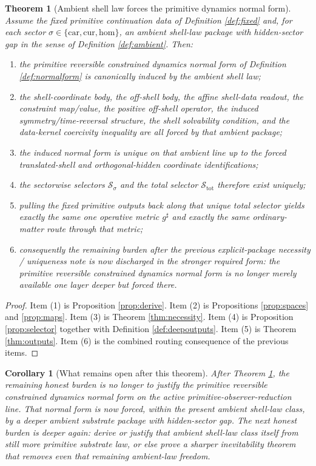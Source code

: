 \documentclass[11pt]{article}
\newcommand{\CompletedMetric}{g^{\sharp}}
\newcommand{\Car}{\mathrm{car}}
\newcommand{\Cur}{\mathrm{cur}}
\newcommand{\Hom}{\mathrm{hom}}
\newcommand{\ChainSelect}[1]{\mathcal S_{#1}}
\newcommand{\ChainSelectTriple}{\mathcal S_{\mathrm{tot}}}
\newtheorem{corollary}{Corollary}
\newtheorem{theorem}{Theorem}
\begin{document}
\begin{theorem}[Ambient shell law forces the primitive dynamics normal form]
\label{thm:main}
Assume the fixed primitive continuation data of Definition \ref{def:fixed} and, for each sector \(\sigma\in\{\Car,\Cur,\Hom\}\), an ambient shell-law package with hidden-sector gap in the sense of Definition \ref{def:ambient}. Then:
\begin{enumerate}
    \item the primitive reversible constrained dynamics normal form of Definition \ref{def:normalform} is canonically induced by the ambient shell law;
    \item the shell-coordinate body, the off-shell body, the affine shell-data readout, the constraint map/value, the positive off-shell operator, the induced symmetry/time-reversal structure, the shell solvability condition, and the data-kernel coercivity inequality are all forced by that ambient package;
    \item the induced normal form is unique on that ambient line up to the forced translated-shell and orthogonal-hidden coordinate identifications;
    \item the sectorwise selectors \(\ChainSelect{\sigma}\) and the total selector \(\ChainSelectTriple\) therefore exist uniquely;
    \item pulling the fixed primitive outputs back along that unique total selector yields exactly the same one operative metric \(\CompletedMetric\) and exactly the same ordinary-matter route through that metric;
    \item consequently the remaining burden after the previous explicit-package necessity / uniqueness note is now discharged in the stronger required form: the primitive reversible constrained dynamics normal form is no longer merely available one layer deeper but forced there.
\end{enumerate}
\end{theorem}

\begin{proof}
Item (1) is Proposition \ref{prop:derive}. Item (2) is Propositions \ref{prop:spaces} and \ref{prop:maps}. Item (3) is Theorem \ref{thm:necessity}. Item (4) is Proposition \ref{prop:selector} together with Definition \ref{def:deepoutputs}. Item (5) is Theorem \ref{thm:outputs}. Item (6) is the combined routing consequence of the previous items.
\end{proof}

\begin{corollary}[What remains open after this theorem]
\label{cor:next}
After Theorem \ref{thm:main}, the remaining honest burden is no longer to justify the primitive reversible constrained dynamics normal form on the active primitive-observer-reduction line. That normal form is now forced, within the present ambient shell-law class, by a deeper ambient substrate package with hidden-sector gap. The next honest burden is deeper again: derive or justify that ambient shell-law class itself from still more primitive substrate law, or else prove a sharper inevitability theorem that removes even that remaining ambient-law freedom.
\end{corollary}
\end{document}
